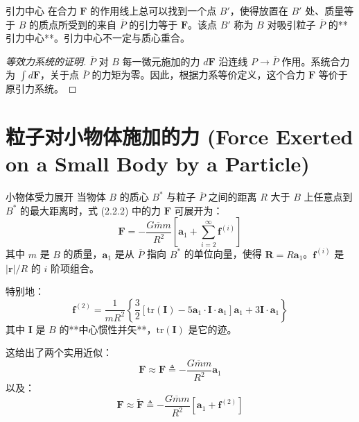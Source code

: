 \begin{mydefinition}{引力中心}
在合力 \(\mathbf{F}\) 的作用线上总可以找到一个点 \(B'\)，使得放置在 \(B'\) 处、质量等于 \(B\) 的质点所受到的来自 \(\overline{P}\) 的引力等于 \(\mathbf{F}\)。该点 \(B'\) 称为 \(B\) 对吸引粒子 \(\overline{P}\) 的**引力中心**。引力中心不一定与质心重合。
\end{mydefinition}

\begin{proof}[等效力系统的证明]
\(\overline{P}\) 对 \(B\) 每一微元施加的力 \(d\mathbf{F}\) 沿连线 \(P\to \overline{P}\) 作用。系统合力为 \(\int d\mathbf{F}\)，关于点 \(\overline{P}\) 的力矩为零。因此，根据力系等价定义，这个合力 \(\mathbf{F}\) 等价于原引力系统。
\end{proof}

\section{粒子对小物体施加的力 (Force Exerted on a Small Body by a Particle)}

\begin{myTheorem}{小物体受力展开}
当物体 \(B\) 的质心 \(B^*\) 与粒子 \(\overline{P}\) 之间的距离 \(R\) 大于 \(B\) 上任意点到 \(B^*\) 的最大距离时，式 (2.2.2) 中的力 \(\mathbf{F}\) 可展开为：
\begin{equation}
\mathbf{F} = -\frac{G\overline{m}m}{R^2}\left[\mathbf{a}_1 + \sum_{i=2}^{\infty}\mathbf{f}^{(i)}\right] \tag{1}
\end{equation}
其中 \(m\) 是 \(B\) 的质量，\(\mathbf{a}_1\) 是从 \(\overline{P}\) 指向 \(B^*\) 的单位向量，使得 \(\mathbf{R} = R\mathbf{a}_1\)。\(\mathbf{f}^{(i)}\) 是 \(|\mathbf{r}|/R\) 的 \(i\) 阶项组合。
\end{myTheorem}
特别地：
\begin{equation}
\mathbf{f}^{(2)} = \frac{1}{mR^2}\left\{\frac{3}{2}\left[\mathrm{tr}(\mathbf{I}) - 5\mathbf{a}_1\cdot \mathbf{I}\cdot \mathbf{a}_1\right]\mathbf{a}_1 + 3\mathbf{I}\cdot \mathbf{a}_1\right\} \tag{3}
\end{equation}
其中 \(\mathbf{I}\) 是 \(B\) 的**中心惯性并矢**，\(\mathrm{tr}(\mathbf{I})\) 是它的迹。

这给出了两个实用近似：
\begin{equation}
\mathbf{F}\approx \hat{\mathbf{F}}\triangleq -\frac{G\overline{m}m}{R^2}\mathbf{a}_1 \tag{5}
\end{equation}
以及：
\begin{equation}
\mathbf{F}\approx \widetilde{\mathbf{F}}\triangleq -\frac{G\overline{m}m}{R^2}[\mathbf{a}_1 + \mathbf{f}^{(2)}] \tag{6}
\end{equation}

